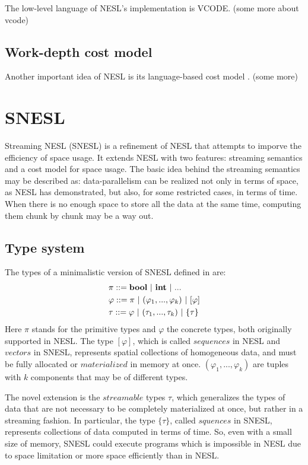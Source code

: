 The low-level language of NESL's implementation is VCODE. 
(some more about vcode)

\subsection{Work-depth cost model}
Another important idea of NESL is its language-based cost model \cite{blel96cost}. 
(some more)

\section{SNESL}
Streaming NESL (SNESL) \cite{Fphd} is a refinement of NESL
that attempts to imporve the efficiency of space usage. 
It extends NESL with two features: streaming semantics and a cost model for space usage. 
The basic idea behind the streaming semantics may be described as:
data-parallelism can be realized not only in terms of space, as NESL has demonstrated, but also, for some restricted cases, in terms of time. 
When there is no enough space to store all the data at the same time, computing them chunk by chunk may be a way out.

\subsection{Type system}

The types of a minimalistic version of SNESL defined in \cite{Fphd} are:
\begin{align*} 
& \pi ::= \bool \ | \ \int \ | \ ...  \\
& \varphi ::= \pi \ | \ (\varphi_1,...,\varphi_k) \ | \ [\varphi]  \\
& \tau ::= \varphi \ | \ (\tau_1,...,\tau_k) \ | \ \tseq{\tau}  
\end{align*}
Here $\pi$ stands for the primitive types and $\varphi$ the concrete types, both originally supported in NESL.
The type $[\varphi]$, which is called $sequences$ in NESL and $vectors$ in SNESL, represents spatial collections of homogeneous data, and must be
fully allocated or $materialized$ in memory at once.  $(\varphi_1,...,\varphi_k)$ are tuples with $k$ components that may be of different types.

The novel extension is the $streamable$ types $\tau$, which generalizes the types of data that are not necessary to be completely materialized at once, but rather in a streaming fashion. 
In particular, the type $\{\tau\}$, called $squences$ in SNESL, represents collections of data computed in terms of time.
So, even with a small size of memory, SNESL could execute programs which is impossible in NESL due to space limitation or more space efficiently than in NESL. 

